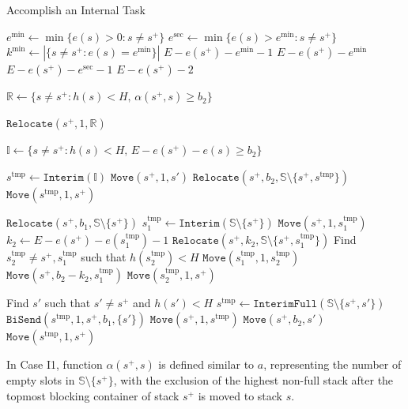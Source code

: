 \documentclass{article}
\newcommand{\mds}{s^\mathrm{dst}}
\newcommand{\mts}{s^\mathrm{tmp}}
\begin{document}
\begin{algorithm}[htbp]

\caption{Accomplish an Internal Task}
\label{cpmp:alg:internal}



\Function{$\alpha(s^+,\mds)$}
{
  $e^{\min}\gets \min\{e(s)>0:s\neq s^+\}$\;
  $e^{\sec}\gets \min\{e(s)>e^{\min}:s\neq s^+\}$\;
  $k^{\min}\gets |\{s\neq s^+ : e(s)=e^{\min}\}|$\;
  \uIf{$e(\mds)> e^{\min}$}
  {
    \Return $E-e(s^+)-e^{\min}-1$\;
  }
  {
    \Return $E-e(s^+)-e^{\min}$\;
  }
  {
     \Return $E-e(s^+)-e^{\sec}-1$\;
  }
  \Else
  {
    \Return $E-e(s^+)-2$\;
  }
}
  {
    {
      
      $\mathbb{R}\gets \{s\neq s^+: h(s)<H,\, \alpha(s^+,s)\ge b_2\}$\;
      
      $\mathtt{Relocate}(s^+,1,\mathbb{R})$\;
    }
    $\mathbb{I}\gets \{s\neq s^+: h(s)<H,\, E-e(s^+)-e(s)\ge b_2\}$\;
    
    $\mts\gets \mathtt{Interim}(\mathbb{I})$\;
    $\mathtt{Move}(s^+,1,s')$\;
    $\mathtt{Relocate}(s^+,b_2,\mathbb{S}\setminus\{s^+,\mts\})$\;
    $\mathtt{Move}(\mts,1,s^+)$\;
  }


  {
    $\mathtt{Relocate}(s^+, b_1, \mathbb{S}\setminus\{s^+\})$\;
    $\mts_1\gets \mathtt{Interim}(\mathbb{S}\setminus\{s^+\})$\;
    $\mathtt{Move}(s^+, 1, \mts_1)$\;
    $k_2\gets E-e(s^+)-e(\mts_1)-1$\;
    $\mathtt{Relocate}(s^+, k_2, \mathbb{S}\setminus\{s^+,\mts_1\})$\;
    Find $\mts_2\neq s^+,\mts_1$ such that $h(\mts_2)<H$\;
    $\mathtt{Move}(\mts_1, 1, \mts_2)$\;
    $\mathtt{Move}(s^+, b_2-k_2, \mts_1)$\;
    $\mathtt{Move}(\mts_2, 1, s^+)$\;
  }
  
  {
    Find $s'$ such that $s'\neq s^+$ and $h(s')<H$\;
    $\mts\gets \mathtt{InterimFull}(\mathbb{S}\setminus\{s^+,s'\})$\;
    $\mathtt{BiSend}(\mts, 1, s^+, b_1, \{s'\})$\;
    $\mathtt{Move}(s^+, 1, \mts)$\;
    $\mathtt{Move}(s^+, b_2, s')$\;
    $\mathtt{Move}(\mts, 1, s^+)$\;
  }
  


\end{algorithm}

In Case I1, function $\alpha(s^+,s)$ is defined similar to $a$, representing the number of empty slots in $\mathbb{S}\setminus\{s^+\}$, with the exclusion of the highest non-full stack after the topmost blocking container of stack $s^+$ is moved to stack $s$.
\end{document}
